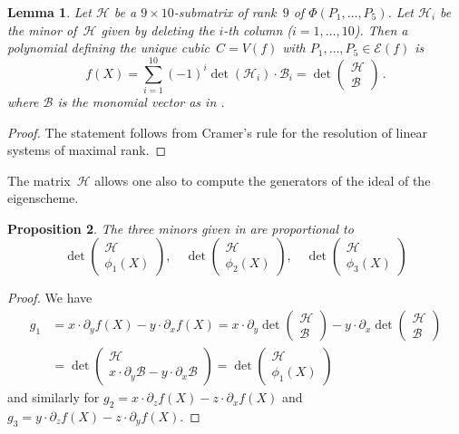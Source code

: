 \documentclass[a4paper, 11pt, reqno]{amsart}
\theoremstyle{plain}
\newtheorem{lemma}{Lemma}[section]
\newtheorem{prop}[lemma]{Proposition}
\theoremstyle{definition}
\newcommand{\de}{\partial}
\newcommand{\Eig}[1]{\mathcal{E}\!\left( {#1} \right)}
\begin{document}
\begin{lemma}
\label{lemma:construct_cubic}
Let $\mathcal{H}$ be a $9 \times 10$-submatrix of rank~$9$ of $\Phi(P_1, \dots, P_5)$.
Let $\mathcal{H}_i$ be the minor of~$\mathcal{H}$ given by deleting the $i$-th column ($i=1, \dots, 10$).
Then a polynomial defining the unique cubic~$C=V(f)$ with $P_1, \dotsc, P_5 \in \Eig{f}$ is
%
\[
  f(X) = \sum_{i=1}^{10}(-1)^i\det(\mathcal{H}_i)\cdot \mathcal{B}_i
  = \det \left(
  \begin{array}{c} \mathcal{H} \\ \mathcal{B} \end{array}
  \right) \,.
\]
%
where $\mathcal{B}$ is the monomial vector as in .
\end{lemma}
\begin{proof}
 The statement follows from Cramer's rule for the resolution of linear systems of maximal rank.
\end{proof}

The matrix~$\mathcal{H}$ allows one also to compute the generators of the ideal of the eigenscheme.

\begin{prop}
\label{proposition:geiser1}
The three minors given in  are proportional to
%
\[
  \det \left(
  \begin{array}{c} \mathcal{H} \\ \phi_1(X) \end{array}
  \right),\quad
  \det \left(
  \begin{array}{c} \mathcal{H} \\ \phi_2(X) \end{array}
  \right), \quad
  \det \left(
  \begin{array}{c} \mathcal{H} \\ \phi_3(X) \end{array}
  \right)
\]
%
\end{prop}
\begin{proof}
We have
%
\begin{align*}
  g_1 & = x \cdot \de_y f(X)- y \cdot \de_x f(X)  =
  x \cdot \de_y \det \left(
  \begin{array}{c} \mathcal{H} \\ \mathcal{B} \end{array}
  \right) - y \cdot
  \de_x \det \left(
  \begin{array}{c} \mathcal{H} \\ \mathcal{B} \end{array}
  \right) \\
  & = \det \left(
  \begin{array}{c} \mathcal{H} \\ x \cdot \de_y \mathcal{B} - y \cdot \de_x \mathcal{B} \end{array}
  \right)  = \det \left(
  \begin{array}{c} \mathcal{H} \\ \phi_1(X) \end{array}
  \right)
\end{align*}
%
and similarly for $g_2 = x \cdot \de_z f(X)- z \cdot \de_x f(X)$
and $g_3 = y \cdot \de_z f(X)- z \cdot \de_y f(X)$.
\end{proof}
\end{document}
